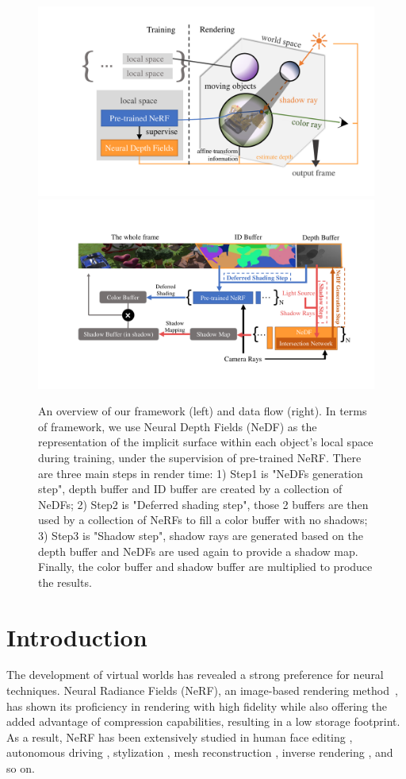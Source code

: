 \documentclass[letterpaper]{article} %
\begin{document}
\begin{figure}[htbp]
    \centering
    \begin{minipage}{\linewidth}
      \includegraphics[width=0.45\linewidth]{figure/overview.pdf}
      \includegraphics[width=0.55\linewidth]{figure/data_flow.pdf}
    \end{minipage}
    \caption{An overview of our framework (left) and data flow (right). In terms of framework, we use Neural Depth Fields (NeDF) as the representation of the implicit surface within each object's local space during training, under the supervision of pre-trained NeRF. There are three main steps in render time: 1) Step1 is "NeDFs generation step", depth buffer and ID buffer are created by a collection of NeDFs; 2) Step2 is "Deferred shading step", those 2 buffers are then used by a collection of NeRFs to fill a color buffer with no shadows; 3) Step3 is "Shadow step", shadow rays are generated based on the depth buffer and NeDFs are used again to provide a shadow map. Finally, the color buffer and shadow buffer are multiplied to produce the results.}
    \label{fig:overview}
\end{figure}

\section{Introduction}
The development of virtual worlds has revealed a strong preference for neural techniques.
Neural Radiance Fields (NeRF), an image-based rendering method~\cite{mildenhall2020nerf}, has shown its proficiency in rendering with high fidelity while also offering the added advantage of compression capabilities, resulting in a low storage footprint. As a result, NeRF has been extensively studied in human face editing \cite{wang2022morf, jiang2022nerffaceediting}, autonomous driving \cite{tancik2022block, kundu2022panoptic}, stylization \cite{gu2021stylenerf}, mesh reconstruction \cite{wang2021neus, sun2022neural}, inverse rendering \cite{boss2021nerd, boss2021neural, zhang2021nerfactor}, and so on.
\end{document}
